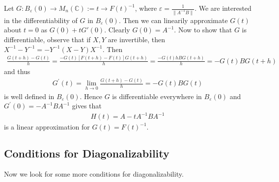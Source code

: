 \documentclass[12pt]{article}
\theoremstyle{definition}
\theoremstyle{remark}
\begin{document}
Let $G: B_\varepsilon(0) \to M_n(\mathbb{C}):= t \to F(t)^{-1}$,
where $ \varepsilon = \frac{1}{\|A^{-1}B\|}$.
We are interested in the differentiability of $G$ in
$B_\varepsilon(0)$. Then we can linearily approximate $G(t)$ about $t
= 0$ as $G(0) + t G'(0)$.
Clearly $G(0) = A^{-1}$. Now to show that $G$ is differentiable,
observe that if $X, Y$ are invertible, then $X^{-1} - Y^{-1} = -
Y^{-1}(X - Y)X^{-1}$. Then
\begin{align*}
  \frac{G(t+h)-G(t)}{h} = \frac{-G(t)[F(t+h)-F(t)]G(t+h)}{h} =
  \frac{-G(t)hBG(t+h)}{h} = -G(t)BG(t+h)
\end{align*}
and thus
\begin{align*}
  G^\prime(t) = \lim_{h \to 0} \frac{G(t+h)-G(t)}{h} =  -G(t)BG(t)
\end{align*}
is well defined in $B_\varepsilon(0)$. Hence $G$ is differentiable
everywhere in $B_\varepsilon(0)$ and $G^\prime(0) = -A^{-1}BA^{-1}$ gives that
\begin{align*}
  H(t) = A - tA^{-1}BA^{-1}
\end{align*}
is a linear approximation for $G(t) = F(t)^{-1}$.

\subsection{Conditions for Diagonalizability}

Now we look for some more conditions for diagonalizability.
\end{document}

